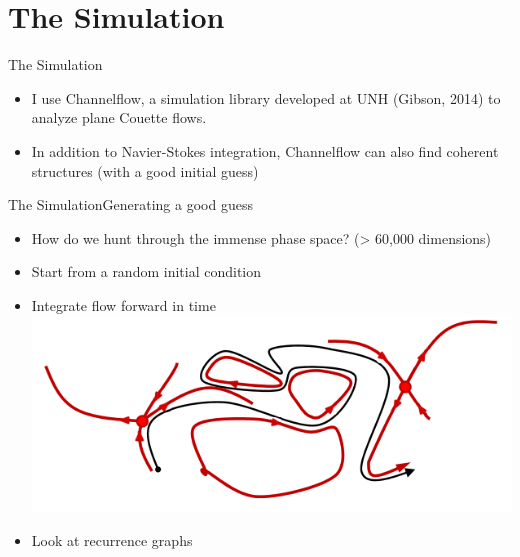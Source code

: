 \documentclass[10pt]{beamer}
\begin{document}
\section{The Simulation}
\begin{frame}{The Simulation}
\begin{itemize}
\item<1-> I use Channelflow, a simulation library developed at UNH (Gibson, 2014) to analyze plane Couette flows.  
\item<2-> In addition to Navier-Stokes integration, Channelflow can also find coherent structures (with a good initial guess)
\end{itemize}
\end{frame}
\begin{frame}{The Simulation}{Generating a good guess}
\begin{itemize}
\item<1-> How do we hunt through the immense phase space? (> 60,000 dimensions)
\item<2-> Start from a random initial condition
\item<3-> Integrate flow forward in time
\includegraphics[scale=0.5]{Images/phaseSpaceTraj}
\hspace{10cm}{\footnotesize Borrero (2014)} 
\item<4-> Look at recurrence graphs
\end{itemize}
\end{frame}
\end{document}
